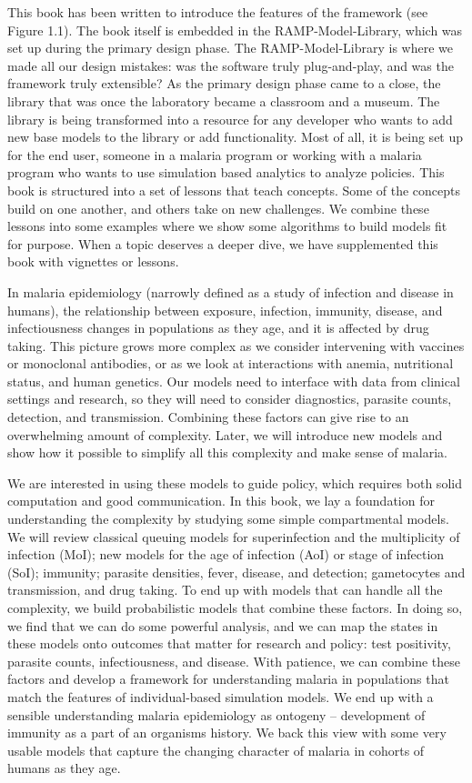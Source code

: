 \documentclass[
]{book}
\begin{document}
This book has been written to introduce the features of the framework (see Figure 1.1). The book itself is embedded in the RAMP-Model-Library, which was set up during the primary design phase. The RAMP-Model-Library is where we made all our design mistakes: was the software truly plug-and-play, and was the framework truly extensible? As the primary design phase came to a close, the library that was once the laboratory became a classroom and a museum. The library is being transformed into a resource for any developer who wants to add new base models to the library or add functionality. Most of all, it is being set up for the end user, someone in a malaria program or working with a malaria program who wants to use simulation based analytics to analyze policies. This book is structured into a set of lessons that teach concepts. Some of the concepts build on one another, and others take on new challenges. We combine these lessons into some examples where we show some algorithms to build models fit for purpose. When a topic deserves a deeper dive, we have supplemented this book with vignettes or lessons.

In malaria epidemiology (narrowly defined as a study of infection and disease in humans), the relationship between exposure, infection, immunity, disease, and infectiousness changes in populations as they age, and it is affected by drug taking. This picture grows more complex as we consider intervening with vaccines or monoclonal antibodies, or as we look at interactions with anemia, nutritional status, and human genetics. Our models need to interface with data from clinical settings and research, so they will need to consider diagnostics, parasite counts, detection, and transmission. Combining these factors can give rise to an overwhelming amount of complexity. Later, we will introduce new models and show how it possible to simplify all this complexity and make sense of malaria.

We are interested in using these models to guide policy, which requires both solid computation and good communication. In this book, we lay a foundation for understanding the complexity by studying some simple compartmental models. We will review classical queuing models for superinfection and the multiplicity of infection (MoI); new models for the age of infection (AoI) or stage of infection (SoI); immunity; parasite densities, fever, disease, and detection; gametocytes and transmission, and drug taking. To end up with models that can handle all the complexity, we build probabilistic models that combine these factors. In doing so, we find that we can do some powerful analysis, and we can map the states in these models onto outcomes that matter for research and policy: test positivity, parasite counts, infectiousness, and disease. With patience, we can combine these factors and develop a framework for understanding malaria in populations that match the features of individual-based simulation models. We end up with a sensible understanding malaria epidemiology as ontogeny -- development of immunity as a part of an organisms history. We back this view with some very usable models that capture the changing character of malaria in cohorts of humans as they age.
\end{document}
